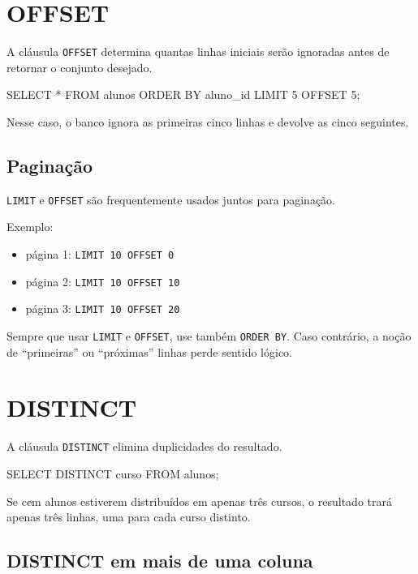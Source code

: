 \section{OFFSET}

A cláusula \texttt{OFFSET} determina quantas linhas iniciais serão ignoradas antes de retornar o conjunto desejado.

\begin{sqlcode}
SELECT *
FROM alunos
ORDER BY aluno_id
LIMIT 5 OFFSET 5;
\end{sqlcode}

Nesse caso, o banco ignora as primeiras cinco linhas e devolve as cinco seguintes.

\subsection{Paginação}

\texttt{LIMIT} e \texttt{OFFSET} são frequentemente usados juntos para paginação.

Exemplo:
\begin{itemize}
    \item página 1: \texttt{LIMIT 10 OFFSET 0}
    \item página 2: \texttt{LIMIT 10 OFFSET 10}
    \item página 3: \texttt{LIMIT 10 OFFSET 20}
\end{itemize}

\begin{quadro_dica}
Sempre que usar \texttt{LIMIT} e \texttt{OFFSET}, use também \texttt{ORDER BY}. Caso contrário, a noção de “primeiras” ou “próximas” linhas perde sentido lógico.
\end{quadro_dica}

\section{DISTINCT}

A cláusula \texttt{DISTINCT} elimina duplicidades do resultado.

\begin{sqlcode}
SELECT DISTINCT curso
FROM alunos;
\end{sqlcode}

Se cem alunos estiverem distribuídos em apenas três cursos, o resultado trará apenas três linhas, uma para cada curso distinto.

\subsection{DISTINCT em mais de uma coluna}

